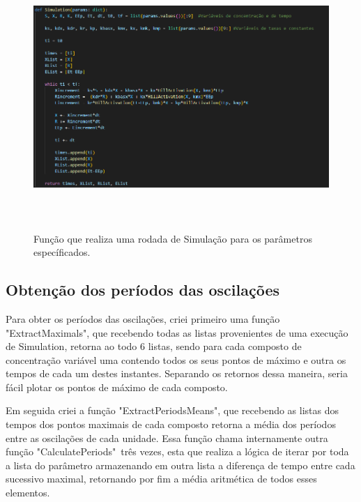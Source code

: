 \documentclass[brazilian,12pt,a4paper,final]{article}
\begin{document}
		\begin{figure}[hbtp]
		\begin{center}
			\includegraphics[height=10cm, width=14cm]{Simulation.png}
			\caption{Função que realiza uma rodada de Simulação para os parâmetros específicados.}
			\label{fig}
		\end{center}
	\end{figure}

	
	\subsection{Obtenção dos períodos das oscilações}
	Para obter os períodos das oscilações, criei primeiro uma função "ExtractMaximals", que recebendo todas as listas provenientes de uma execução de Simulation, retorna ao todo 6 listas, sendo para cada composto de concentração variável uma contendo todos os seus pontos de máximo e outra os tempos de cada um destes instantes. Separando os retornos dessa maneira, seria fácil plotar os pontos de máximo de cada composto.
	\vspace{0.5cm}
	
	Em seguida criei a função "ExtractPeriodsMeans", que recebendo as listas dos tempos dos pontos maximais de cada composto retorna a média dos períodos entre as oscilações de cada unidade. Essa função chama internamente outra função "CalculatePeriods"\ três vezes, esta que realiza a lógica de iterar por toda a lista do parâmetro armazenando em outra lista a diferença de tempo entre cada sucessivo maximal, retornando por fim a média aritmética de todos esses elementos.
	
\end{document}

